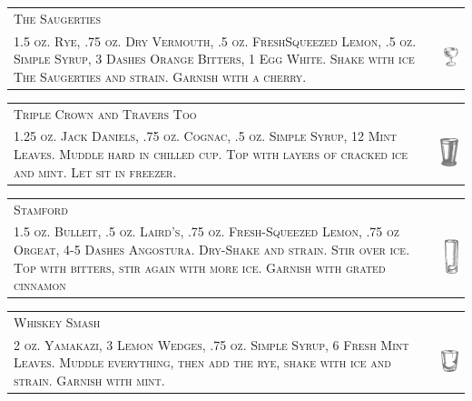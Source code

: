 \documentclass{article}
\begin{document}
\begin{tabular}{b{2.5in} m{0.625in}}
  \multicolumn{2}{p{3.0in}}{\centering\Huge\textsc{The Saugerties}} \\ 
  
  \textsc{1.5 oz. Rye, .75 oz. Dry Vermouth, .5 oz. FreshSqueezed
    Lemon, .5 oz. Simple Syrup, 3 Dashes Orange Bitters, 1 Egg
    White. Shake with ice The Saugerties and strain. Garnish with a
    cherry.} & \includegraphics[width=0.5in]{coupe.png}
\end{tabular}

\begin{tabular}{b{2.5in} m{0.625in}}
  \multicolumn{2}{p{3.0in}}{\centering\Huge\textsc{Triple Crown and Travers Too}} \\ 
  
  \textsc{1.25 oz. Jack Daniels, .75 oz. Cognac, .5 oz. Simple Syrup,
    12 Mint Leaves. Muddle hard in chilled cup. Top with layers of
    cracked ice and mint. Let sit in freezer.} &
  \includegraphics[width=0.5in]{julep.png}
\end{tabular}

\begin{tabular}{b{2.5in} m{0.625in}}
  \multicolumn{2}{p{3.0in}}{\centering\Huge\textsc{Stamford}} \\ 
  
  \textsc{1.5 oz. Bulleit, .5 oz. Laird's, .75 oz.  Fresh-Squeezed
    Lemon, .75 oz Orgeat, 4-5 Dashes Angostura. Dry-Shake and
    strain. Stir over ice. Top with bitters, stir again with more
    ice. Garnish with grated cinnamon} &
  \includegraphics[width=0.5in]{collins.png}
\end{tabular}

\begin{tabular}{b{2.5in} m{0.625in}}
  \multicolumn{2}{p{3.0in}}{\centering\Huge\textsc{Whiskey Smash}} \\ 
  
  \textsc{2 oz. Yamakazi, 3 Lemon Wedges, .75 oz.  Simple Syrup, 6
    Fresh Mint Leaves. Muddle everything, then add the rye, shake with
    ice and strain. Garnish with mint.} &
  \includegraphics[width=0.5in]{rocks_glass.png}
\end{tabular}
\end{document}
